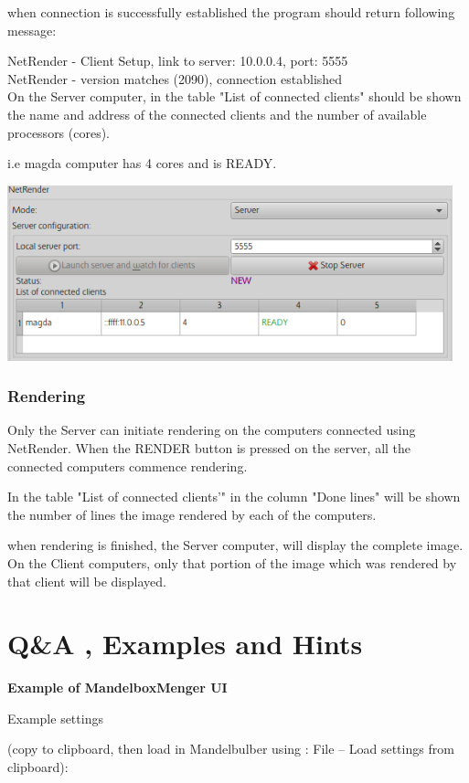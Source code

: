 when connection is successfully established the program should return
following message:

NetRender - Client Setup, link to server: 10.0.0.4, port: 5555\\
NetRender - version matches (2090), connection
established\\[2\baselineskip]On the Server computer, in the table "List
of connected clients" should be shown the name and address of the
connected clients and the number of available processors (cores).

i.e magda computer has 4 cores and is READY.

\includegraphics[width=5.07283in,height=1.99843in]{img/manual/media/image30.png}

\subsubsection{Rendering}\label{rendering}

Only the Server can initiate rendering on the computers connected using
NetRender. When the RENDER button is pressed on the server, all the
connected computers commence rendering.

In the table "List of connected clients'" in the column "Done lines"
will be shown the number of lines the image rendered by each of the
computers.

when rendering is finished, the Server computer, will display the
complete image. On the Client computers, only that portion of the image
which was rendered by that client will be displayed.

\section{Q\&A , Examples and Hints}\label{qa-examples-and-hints}

\textbf{Example of MandelboxMenger UI}

Example settings

(copy to clipboard, then load in Mandelbulber using : File -- Load
settings from clipboard):

